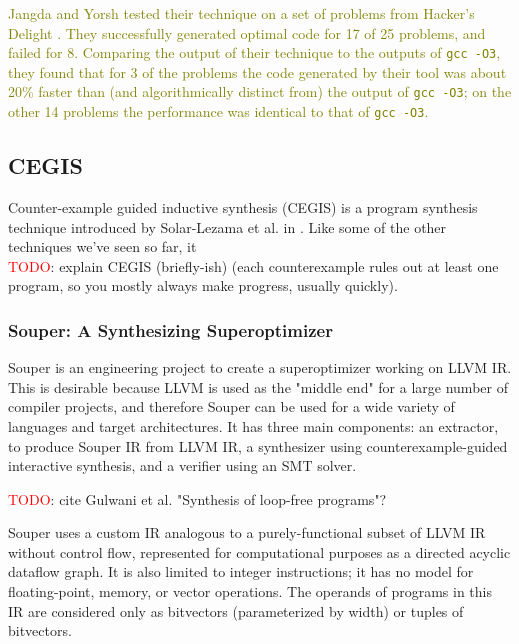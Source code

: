 \documentclass[12pt,twoside]{reedthesis}
\newcommand{\red}[1]{\textcolor{red}{#1}}
\newcommand{\green}[1]{\textcolor{olive}{#1}}
\begin{document}
            \green{
            Jangda and Yorsh tested their technique on a set of problems from Hacker's Delight \cite{warren2013hackers}.
            They successfully generated optimal code for 17 of 25 problems, and failed for 8.
            Comparing the output of their technique to the outputs of \texttt{gcc -O3}, they found that for 3 of the problems the code generated by their tool was about 20\% faster than (and algorithmically distinct from) the output of \texttt{gcc -O3}; on the other 14 problems the performance was identical to that of \texttt{gcc -O3}.
            }

    \subsection{CEGIS}
        Counter-example guided inductive synthesis (CEGIS) is a program synthesis technique introduced by Solar-Lezama et al. in \cite{solar-lezama2006sketch}.
        Like some of the other techniques we've seen so far, it
        \\  \red{TODO}: explain CEGIS (briefly-ish) (each counterexample rules out at least one program, so you mostly always make progress, usually quickly).

        \subsubsection{Souper: A Synthesizing Superoptimizer}
            Souper \cite{sasnauskas2017souper} is an engineering project to create a superoptimizer working on LLVM IR.
            This is desirable because LLVM is used as the "middle end" for a large number of compiler projects, and therefore Souper can be used for a wide variety of languages and target architectures.
            It has three main components:
                an extractor, to produce Souper IR from LLVM IR,
                a synthesizer using counterexample-guided interactive synthesis,
                and a verifier using an SMT solver.
            
            \red{TODO}: cite Gulwani et al. "Synthesis of loop-free programs"?
            
            Souper uses a custom IR analogous to a purely-functional subset of LLVM IR without control flow\footnotemark, represented for computational purposes as a directed acyclic dataflow graph.
            It is also limited to integer instructions; it has no model for floating-point, memory, or vector operations.
            The operands of programs in this IR are considered only as bitvectors (parameterized by width) or tuples of bitvectors.
            
\end{document}
